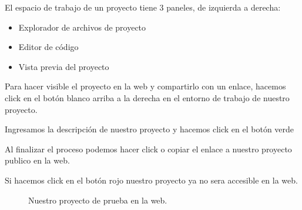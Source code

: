 \documentclass[letterpaper,10pt,spanish]{sphinxmanual}
\begin{document}
El espacio de trabajo de un proyecto tiene 3 paneles, de izquierda a derecha:
\begin{itemize}
\item {} 
Explorador de archivos de proyecto

\item {} 
Editor de código

\item {} 
Vista previa del proyecto

\end{itemize}

\begin{figure}[htbp]
\centering

\noindent{}
\end{figure}

Para hacer visible el proyecto en la web y compartirlo con un enlace, hacemos
click en el botón blanco  arriba a la derecha en el entorno de
trabajo de nuestro proyecto.

\begin{figure}[htbp]
\centering

\noindent{}
\end{figure}

Ingresamos la descripción de nuestro proyecto y hacemos click en el botón verde

\begin{figure}[htbp]
\centering

\noindent{}
\end{figure}

Al finalizar el proceso podemos hacer click o copiar el enlace a nuestro
proyecto publico en la web.

Si hacemos click en el botón rojo  nuestro
proyecto ya no sera accesible en la web.

\begin{figure}[htbp]
\centering

\noindent{}
\end{figure}

\begin{figure}[htbp]
\centering
\capstart

\noindent{}
\caption{Nuestro proyecto de prueba en la web.}\label{\detokenize{introduccion:id4}}\end{figure}
\end{document}
